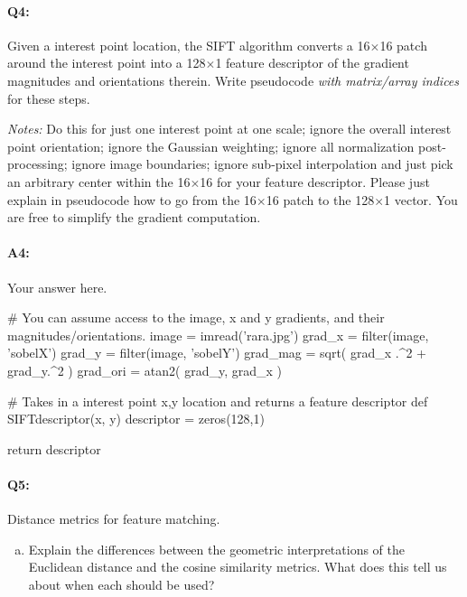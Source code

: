 

\pagebreak
\paragraph{Q4:} Given a interest point location, the SIFT algorithm converts a 16$\times$16 patch around the interest point into a 128$\times$1 feature descriptor of the gradient magnitudes and orientations therein. Write pseudocode \emph{with matrix/array indices} for these steps.

\emph{Notes:} Do this for just one interest point at one scale; ignore the overall interest point orientation; ignore the Gaussian weighting; ignore all normalization post-processing; ignore image boundaries; ignore sub-pixel interpolation and just pick an arbitrary center within the 16$\times$16 for your feature descriptor. Please just explain in pseudocode how to go from the 16$\times$16 patch to the 128$\times$1 vector. You are free to simplify the gradient computation.

\paragraph{A4:} Your answer here.

\begin{python}
# You can assume access to the image, x and y gradients, and their magnitudes/orientations.
image = imread('rara.jpg')
grad_x = filter(image, 'sobelX')
grad_y = filter(image, 'sobelY')
grad_mag = sqrt( grad_x .^2 + grad_y.^2 )
grad_ori = atan2( grad_y, grad_x )

# Takes in a interest point x,y location and returns a feature descriptor
def SIFTdescriptor(x, y)
    descriptor = zeros(128,1)


    return descriptor
\end{python}





\pagebreak
\paragraph{Q5:} Distance metrics for feature matching.

\begin{enumerate}[(a)]
    \item Explain the differences between the geometric interpretations of the Euclidean distance and the cosine similarity metrics. What does this tell us about when each should be used?
\end{enumerate}

